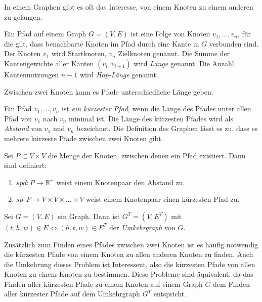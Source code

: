 In einem Graphen gibt es oft das Interesse, von einem Knoten zu einem anderen zu gelangen.

\begin{definition}[Pfad]
    Ein Pfad auf einem Graph $G = (V, E)$ ist eine Folge von Knoten $v_1, \dotsc, v_n$, für die gilt, dass benachbarte Knoten im Pfad durch eine Kante in $G$ verbunden sind.
    Der Knoten $v_1$ wird Startknoten, $v_n$ Zielknoten genannt.
    Die Summe der Kantengewichte aller Kanten $(v_i, v_{i + 1})$ wird \emph{Länge} genannt.
    Die Anzahl Kantennutzungen $n - 1$ wird \emph{Hop-Länge} genannt.
\end{definition}

Zwischen zwei Knoten kann es Pfade unterschiedliche Länge geben.

\begin{definition}
    Ein Pfad $v_1, \dotsc, v_n$ ist \emph{ein kürzester Pfad}, wenn die Länge des Pfades unter allen Pfad von $v_1$ nach $v_n$ minimal ist. Die Länge des kürzesten Pfades wird als \emph{Abstand} von $v_1$ und $v_n$ bezeichnet. Die Definition des Graphen lässt es zu, dass es mehrere kürzeste Pfade zwischen zwei Knoten gibt.

    Sei $P \subset V \times V$ die Menge der Knoten, zwischen denen ein Pfad existiert. Dann sind definiert:
    \begin{enumerate}
        \item
              ${spd} \colon P \to \mathbb{R}^+$ weist einem Knotenpaar den Abstand zu.

        \item
              ${sp} \colon P \to V \times V \times \dots \times V$ weist einem Knotenpaar einen kürzesten Pfad zu.
    \end{enumerate}
\end{definition}

\begin{definition}[Umkehrgraph]
    Sei $G = (V, E)$ ein Graph. Dann ist $G^T = (V, E^T)$ mit $(t, h, w) \in E \Leftrightarrow (h, t, w) \in E^T$ der \emph{Umkehrgraph} von $G$.
\end{definition}

Zusätzlich zum Finden eines Pfades zwischen zwei Knoten ist es häufig notwendig die kürzesten Pfade von einem Knoten zu allen anderen Knoten zu finden.
Auch die Umkehrung dieses Problem ist Interessent, also die kürzesten Pfade von allen Knoten zu einem Knoten zu bestimmen.
Diese Probleme sind äquivalent, da das Finden aller kürzesten Pfade zu einem Knoten auf einem Graph $G$ dem Finden aller kürzester Pfade auf dem Umkehrgraph $G^T$ entspricht.

